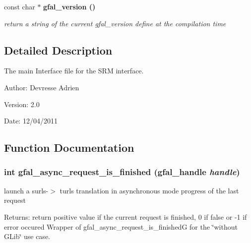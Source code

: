 \begin{CompactItemize}
\item 
const char $\ast$ \bf{gfal\_\-version} ()
\begin{CompactList}\small\item\em return a string of the current gfal\_\-version define at the compilation time \item\end{CompactList}\end{CompactItemize}


\subsection{Detailed Description}
The main Interface file for the SRM interface. 

\begin{Desc}
\item[Author:]Devresse Adrien \end{Desc}
\begin{Desc}
\item[Version:]2.0 \end{Desc}
\begin{Desc}
\item[Date:]12/04/2011 \end{Desc}


\subsection{Function Documentation}
\subsubsection{\setlength{\rightskip}{0pt plus 5cm}int gfal\_\-async\_\-request\_\-is\_\-finished (gfal\_\-handle {\em handle})}\label{gfal__common__interface_8h_ce6fcac8e92ad2e1d699eed2ce74a257}


launch a surls-$>$ turls translation in asynchronous mode progress of the last request 

\begin{Desc}
\item[Returns:]return positive value if the current request is finished, 0 if false or -1 if error occured Wrapper of gfal\_\-async\_\-request\_\-is\_\-finished\-G for the \char`\"{}without GLib\char`\"{} use case. \end{Desc}
